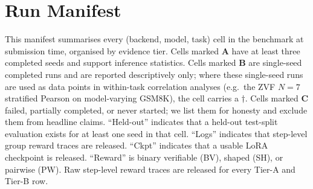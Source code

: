 \documentclass{article}
\begin{document}
\section{Run Manifest}
\label{sec:run-manifest}

This manifest summarises every (backend, model, task) cell in the benchmark
at submission time, organised by evidence tier. Cells marked \textbf{A} have at
least three completed seeds and support inference statistics. Cells marked
\textbf{B} are single-seed completed runs and are reported descriptively only;
where these single-seed runs are used as data points in within-task
correlation analyses (e.g.\ the ZVF $N{=}7$ stratified Pearson on
model-varying GSM8K), the cell carries a $\dagger$. Cells marked
\textbf{C} failed, partially completed, or never started; we list
them for honesty and exclude them from headline claims. ``Held-out'' indicates
that a held-out test-split evaluation exists for at least one seed in that cell.
``Logs'' indicates that step-level group reward traces are released.
``Ckpt'' indicates that a usable LoRA checkpoint is released.
``Reward'' is binary verifiable (BV), shaped (SH), or pairwise (PW). Raw
step-level reward traces are released for every Tier-A and Tier-B row.
\end{document}
